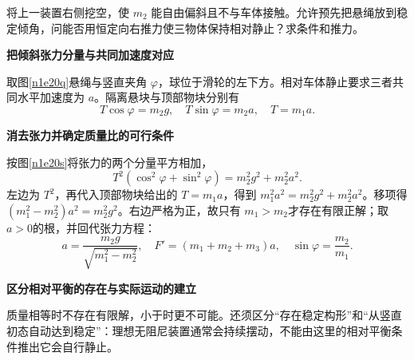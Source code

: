 \begin{question}\begin{example}[取消侧壁后的悬块]\label{n1e20}
将上一装置右侧挖空，使 $m_2$ 能自由偏斜且不与车体接触。允许预先把悬绳放到稳定倾角，问能否用恒定向右推力使三物体保持相对静止？求条件和推力。
\end{example}\end{question}
\begin{solution}\textbf{把倾斜张力分量与共同加速度对应}\par\nobreak
取图\ref{n1e20q}悬绳与竖直夹角 $\varphi$，球位于滑轮的左下方。相对车体静止要求三者共同水平加速度为 $a$。隔离悬块与顶部物块分别有
\[
 T\cos\varphi=m_2g,\quad T\sin\varphi=m_2a,\quad T=m_1a.
\]


\par\medskip{}\noindent\textbf{消去张力并确定质量比的可行条件}\par\nobreak
按图\ref{n1e20s}将张力的两个分量平方相加，
\[
 T^2(\cos^2\varphi+\sin^2\varphi)=m_2^2g^2+m_2^2a^2.
\]
左边为 $T^2$，再代入顶部物块给出的 $T=m_1a$，得到 $m_1^2a^2=m_2^2g^2+m_2^2a^2$。移项得 $(m_1^2-m_2^2)a^2=m_2^2g^2$。右边严格为正，故只有 $m_1>m_2$才存在有限正解；取 $a>0$的根，并回代张力方程：
\[
 a=\frac{m_2g}{\sqrt{m_1^2-m_2^2}},\quad
 F'=(m_1+m_2+m_3)a,\quad \sin\varphi=\frac{m_2}{m_1}.
\]


\par\medskip{}\noindent\textbf{区分相对平衡的存在与实际运动的建立}\par\nobreak
质量相等时不存在有限解，小于时更不可能。还须区分“存在稳定构形”和“从竖直初态自动达到稳定”：理想无阻尼装置通常会持续摆动，不能由这里的相对平衡条件推出它会自行静止。
\end{solution}

